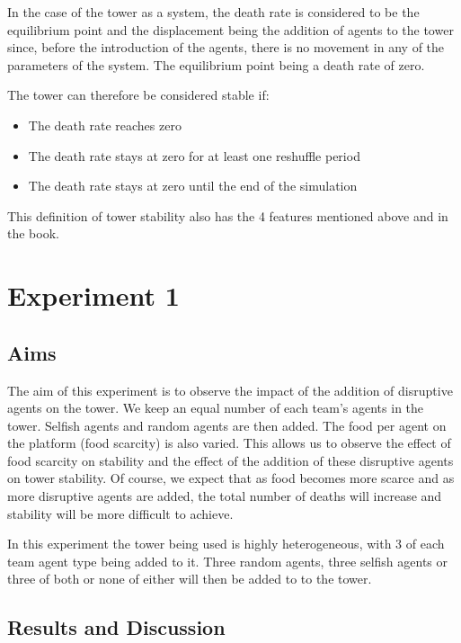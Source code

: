 In the case of the tower as a system, the death rate is considered to be the equilibrium point and the displacement being the addition of agents to the tower since, before the introduction of the agents, there is no movement in any of the parameters of the system. The equilibrium point being a death rate of zero. 

The tower can therefore be considered stable if:
\begin{itemize}
    \item The death rate reaches zero
    \item The death rate stays at zero for at least one reshuffle period
    \item The death rate stays at zero until the end of the simulation
\end{itemize}
 
This definition of tower stability also has the 4 features mentioned above and in the book.

\section{Experiment 1}
\label{sec: Experiment 1}
\subsection{Aims}
\label{subsec: E1-Aims}
The aim of this experiment is to observe the impact of the addition of disruptive agents on the tower. 
We keep an equal number of each team’s agents in the tower. Selfish agents and random agents are then added. The food per agent on the platform (food scarcity) is also varied. This allows us to observe the effect of food scarcity on stability and the effect of the addition of these disruptive agents on tower stability. Of course, we expect that as food becomes more scarce and as more disruptive agents are added, the total number of deaths will increase and stability will be more difficult to achieve.

In this experiment the tower being used is highly heterogeneous, with 3 of each team agent type being added to it. Three random agents, three selfish agents or three of both or none of either will then be added to to the tower.
\subsection{Results and Discussion}
\label{subsec: E1-Results and Discussion}

